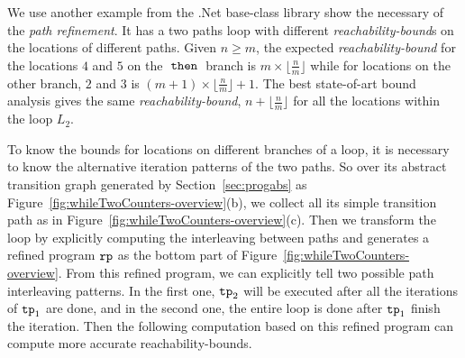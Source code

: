 \begin{example}
  \label{ex:twoCounterWhile}
  We use another example from the .Net base-class library show the necessary of the \emph{path refinement}. It has a two paths loop
  with different \emph{reachability-bound}s on the locations of different paths.
  Given $n \geq m$,
  the expected \emph{reachability-bound} for the locations $4$ and $5$ on the $\mathtt{\;then\;}$ branch is $m \times \lfloor\frac{n}{m}\rfloor$
  while for locations on the other branch, $2$ and $3$ is $(m + 1) \times \lfloor\frac{n}{m}\rfloor + 1$. 
  The best state-of-art bound analysis
  gives the same \emph{reachability-bound}, $n + \lfloor\frac{n}{m}\rfloor$ for all the locations within the loop $L_2$.
  
  To know the bounds for locations on different branches of a loop, 
  it is necessary to know the alternative iteration patterns of the two paths.
  So over its abstract transition graph generated by Section~\ref{sec:progabs} as Figure~\ref{fig:whileTwoCounters-overview}(b), we collect all its simple transition path as in Figure~\ref{fig:whileTwoCounters-overview}(c).
  Then we transform the loop by explicitly computing the interleaving between paths and
  generates a refined program $\mathtt{rp}$ as the bottom part of Figure~\ref{fig:whileTwoCounters-overview}.
  From this refined program, we can explicitly tell two possible path interleaving patterns.
  In the first one, $\mathtt{tp}_2$ will be executed after all the iterations of $\mathtt{tp}_1$ are done, and in the second one,
  the entire loop is done after $\mathtt{tp}_1$ finish the iteration.
  Then the following computation based on this refined program can compute more accurate reachability-bounds.
  \end{example}